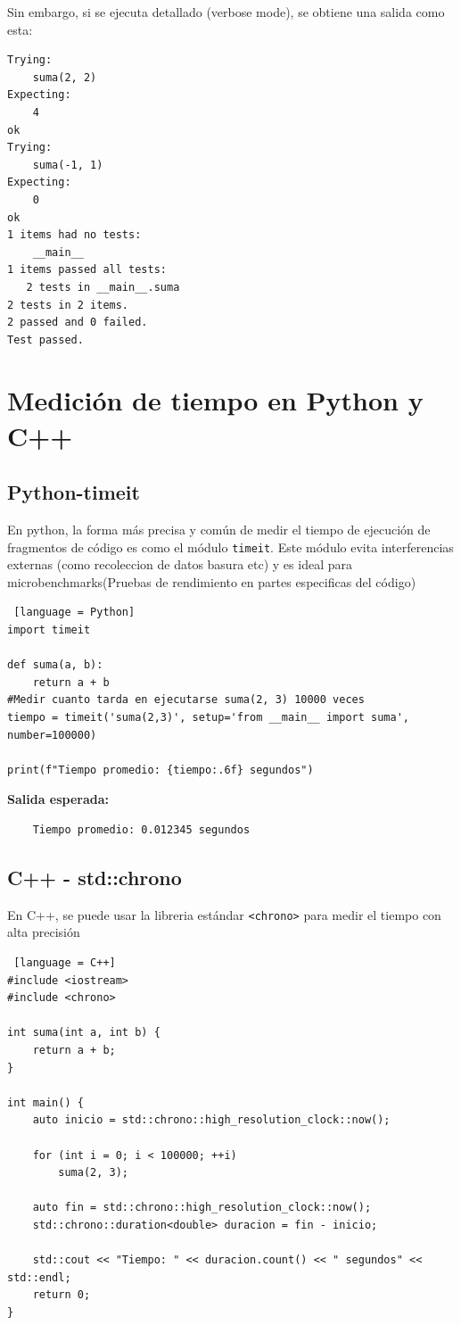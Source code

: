 \documentclass[12pt]{article}
\begin{document}
Sin embargo, si se ejecuta detallado (verbose mode), se obtiene una salida como esta:

\begin{lstlisting}
Trying:
    suma(2, 2)
Expecting:
    4
ok
Trying:
    suma(-1, 1)
Expecting:
    0
ok
1 items had no tests:
    __main__
1 items passed all tests:
   2 tests in __main__.suma
2 tests in 2 items.
2 passed and 0 failed.
Test passed.
\end{lstlisting}

\section{Medición de tiempo en Python y C++}

\subsection*{Python-timeit}
En python, la forma más precisa y común de medir el tiempo de ejecución de fragmentos de código es como el módulo \texttt{timeit}. Este módulo evita interferencias externas (como recoleccion de datos basura etc) y es ideal para microbenchmarks(Pruebas de rendimiento en partes especificas del código)

\begin{lstlisting} [language = Python]
import timeit

def suma(a, b):
    return a + b
#Medir cuanto tarda en ejecutarse suma(2, 3) 10000 veces
tiempo = timeit('suma(2,3)', setup='from __main__ import suma', number=100000)

print(f"Tiempo promedio: {tiempo:.6f} segundos")
\end{lstlisting}

\textbf{Salida esperada:}
\begin{lstlisting}
    Tiempo promedio: 0.012345 segundos
\end{lstlisting}

\subsection*{C++ - std::chrono}
En C++, se puede usar la libreria estándar \texttt{<chrono>} para medir el tiempo con alta precisión 

\begin{lstlisting} [language = C++]
#include <iostream>
#include <chrono>

int suma(int a, int b) {
    return a + b;
}

int main() {
    auto inicio = std::chrono::high_resolution_clock::now();

    for (int i = 0; i < 100000; ++i)
        suma(2, 3);

    auto fin = std::chrono::high_resolution_clock::now();
    std::chrono::duration<double> duracion = fin - inicio;

    std::cout << "Tiempo: " << duracion.count() << " segundos" << std::endl;
    return 0;
}
\end{lstlisting}
\end{document}
